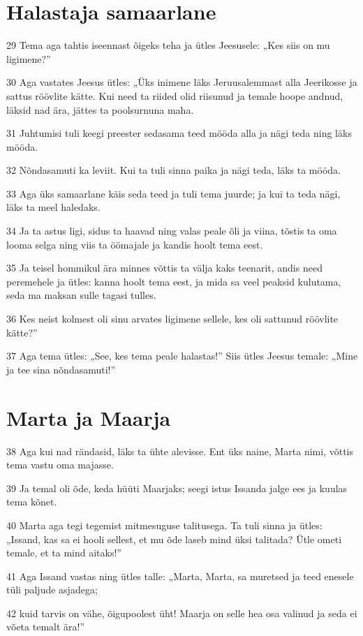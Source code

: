 \section*{Halastaja samaarlane}

\par 29 Tema aga tahtis iseennast õigeks teha ja ütles Jeesusele: „Kes siis on mu ligimene?”
\par 30 Aga vastates Jeesus ütles: „Üks inimene läks Jeruusalemmast alla Jeerikosse ja sattus röövlite kätte. Kui need ta riided olid riisunud ja temale hoope andnud, läksid nad ära, jättes ta poolsurnuna maha.
\par 31 Juhtumisi tuli keegi preester sedasama teed mööda alla ja nägi teda ning läks mööda.
\par 32 Nõndasamuti ka leviit. Kui ta tuli sinna paika ja nägi teda, läks ta mööda.
\par 33 Aga üks samaarlane käis seda teed ja tuli tema juurde; ja kui ta teda nägi, läks ta meel haledaks.
\par 34 Ja ta astus ligi, sidus ta haavad ning valas peale õli ja viina, tõstis ta oma looma selga ning viis ta öömajale ja kandis hoolt tema eest.
\par 35 Ja teisel hommikul ära minnes võttis ta välja kaks teenarit, andis need peremehele ja ütles: kanna hoolt tema eest, ja mida sa veel peaksid kulutama, seda ma maksan sulle tagasi tulles.
\par 36 Kes neist kolmest oli sinu arvates ligimene sellele, kes oli sattunud röövlite kätte?”
\par 37 Aga tema ütles: „See, kes tema peale halastas!” Siis ütles Jeesus temale: „Mine ja tee sina nõndasamuti!”

\section*{Marta ja Maarja}

\par 38 Aga kui nad rändasid, läks ta ühte alevisse. Ent üks naine, Marta nimi, võttis tema vastu oma majasse.
\par 39 Ja temal oli õde, keda hüüti Maarjaks; seegi istus Issanda jalge ees ja kuulas tema kõnet.
\par 40 Marta aga tegi tegemist mitmesuguse talitusega. Ta tuli sinna ja ütles: „Issand, kas sa ei hooli sellest, et mu õde laseb mind üksi talitada? Ütle ometi temale, et ta mind aitaks!”
\par 41 Aga Issand vastas ning ütles talle: „Marta, Marta, sa muretsed ja teed enesele tüli paljude asjadega;
\par 42 kuid tarvis on vähe, õigupoolest üht! Maarja on selle hea osa valinud ja seda ei võeta temalt ära!”


